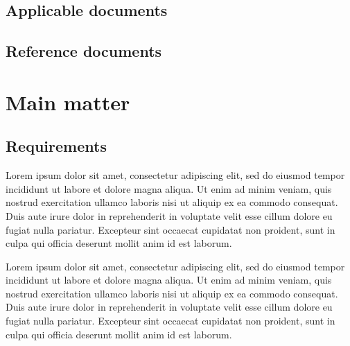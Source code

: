\documentclass[12pt,a4paper]{article}
\begin{document}
\subsection{Applicable documents}
\begin{ADlist}
\end{ADlist}


\subsection{Reference documents}
\begin{RDlist}
\end{RDlist}



\section{Main matter}

\subsection{Requirements}
Lorem ipsum dolor sit amet, consectetur adipiscing elit, sed do eiusmod tempor incididunt ut labore et dolore magna aliqua. Ut enim ad minim veniam, quis nostrud exercitation ullamco laboris nisi ut aliquip ex ea commodo consequat. Duis aute irure dolor in reprehenderit in voluptate velit esse cillum dolore eu fugiat nulla pariatur. Excepteur sint occaecat cupidatat non proident, sunt in culpa qui officia deserunt mollit anim id est laborum.

Lorem ipsum dolor sit amet, consectetur adipiscing elit, sed do eiusmod tempor incididunt ut labore et dolore magna aliqua. Ut enim ad minim veniam, quis nostrud exercitation ullamco laboris nisi ut aliquip ex ea commodo consequat. Duis aute irure dolor in reprehenderit in voluptate velit esse cillum dolore eu fugiat nulla pariatur. Excepteur sint occaecat cupidatat non proident, sunt in culpa qui officia deserunt mollit anim id est laborum.
\end{document}
